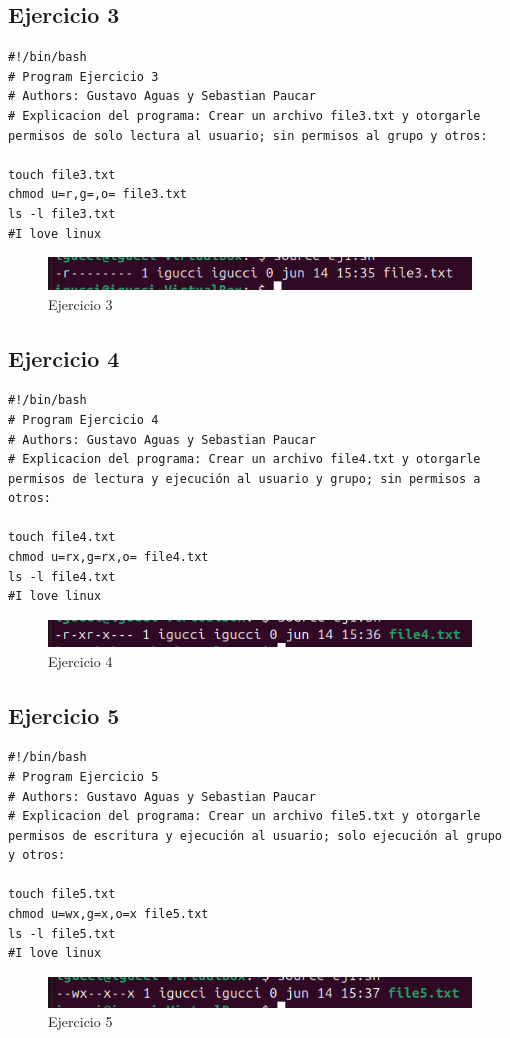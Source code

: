\documentclass[11pt,twoside]{book}
\begin{document}
\subsection{Ejercicio 3}
\begin{lstlisting}
#!/bin/bash
# Program Ejercicio 3
# Authors: Gustavo Aguas y Sebastian Paucar
# Explicacion del programa: Crear un archivo file3.txt y otorgarle permisos de solo lectura al usuario; sin permisos al grupo y otros:

touch file3.txt
chmod u=r,g=,o= file3.txt
ls -l file3.txt
#I love linux
\end{lstlisting}
\begin{figure}[h]
    \centering
    \includegraphics[width=1\linewidth]{psimb/ej3.png}
    \caption{Ejercicio 3}
\end{figure}

\subsection{Ejercicio 4}
\begin{lstlisting}
#!/bin/bash
# Program Ejercicio 4
# Authors: Gustavo Aguas y Sebastian Paucar
# Explicacion del programa: Crear un archivo file4.txt y otorgarle permisos de lectura y ejecución al usuario y grupo; sin permisos a otros:

touch file4.txt
chmod u=rx,g=rx,o= file4.txt
ls -l file4.txt
#I love linux
\end{lstlisting}
\begin{figure}[h]
    \centering
    \includegraphics[width=1\linewidth]{psimb/ej4.png}
    \caption{Ejercicio 4}
\end{figure}

\subsection{Ejercicio 5}
\begin{lstlisting}
#!/bin/bash
# Program Ejercicio 5
# Authors: Gustavo Aguas y Sebastian Paucar
# Explicacion del programa: Crear un archivo file5.txt y otorgarle permisos de escritura y ejecución al usuario; solo ejecución al grupo y otros:

touch file5.txt
chmod u=wx,g=x,o=x file5.txt
ls -l file5.txt
#I love linux
\end{lstlisting}
\begin{figure}[h]
    \centering
    \includegraphics[width=1\linewidth]{psimb/ej5.png}
    \caption{Ejercicio 5}
\end{figure}
\end{document}
